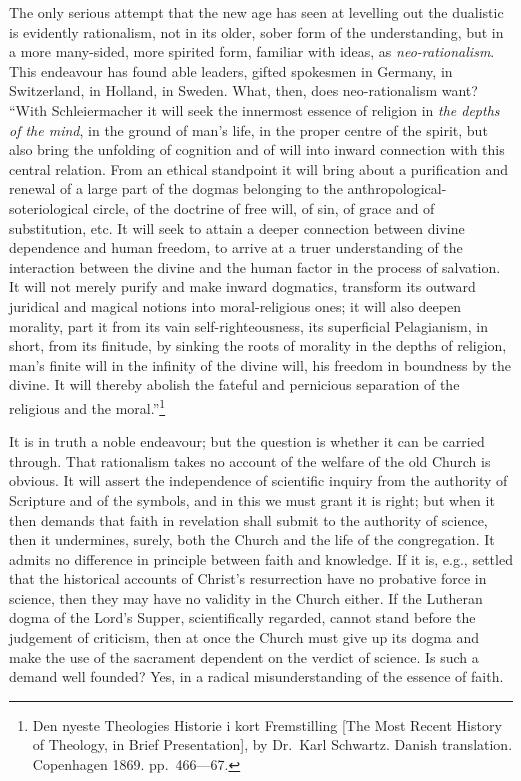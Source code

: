 \documentclass[12pt,a4paper,openany]{book}
\newcommand{\opage}[1]{\marginnote{\footnotesize\textit{[#1]}}}
\begin{document}
The only serious attempt that the new age has seen
at levelling out the dualistic is evidently rationalism,
not in its older, sober form of the understanding, but
in a more many-sided, more spirited form, familiar with ideas,
as \emph{neo-rationalism}. This endeavour has found
able leaders, gifted spokesmen in Germany, in
Switzerland, in Holland, in Sweden. What, then, does neo-rationalism want?
``With Schleiermacher it will seek the innermost essence
of religion in \emph{the depths of the mind}, in the ground of man's life,
in the proper centre of the spirit, but also bring
the unfolding of cognition and of will into inward connection
with this central relation. From an ethical
standpoint it will bring about a purification and renewal of
a large part of the dogmas belonging to the anthropological-soteriological
circle, of the doctrine of free will, of
sin, of grace and of substitution, etc. It
will seek to attain a deeper connection between divine
dependence and human freedom, to
arrive at a truer understanding of the interaction
between the divine and the human factor in
the process of salvation. It will not merely purify and make inward
dogmatics, transform its outward juridical and
magical notions into moral-religious ones; it will
also deepen morality, part it from its vain
self-righteousness, its superficial Pelagianism, in
short, from its finitude, by sinking the roots of morality
in the depths of religion, man's finite
will in the infinity of the divine will, his
freedom in boundness by the divine. It will
\setcounter{footnote}{0}%
\opage{105}thereby abolish the fateful and pernicious
separation of the religious and the moral.''\footnote{Den nyeste Theologies Historie i kort Fremstilling [The Most Recent History of Theology, in Brief Presentation], by Dr.\ Karl Schwartz. Danish translation. Copenhagen 1869. pp.\ 466---67.}

It is in truth a noble endeavour; but the question
is whether it can be carried through. That rationalism
takes no account of the welfare of the old Church is obvious.
It will assert the independence of scientific inquiry
from the authority of Scripture and of the symbols,
and in this we must grant it is right; but when it then
demands that faith in revelation shall submit to
the authority of science, then it undermines, surely, both
the Church and the life of the congregation. It admits no
difference in principle between faith and knowledge. If it is, e.g.,
settled that the historical accounts of Christ's resurrection
have no probative force in science, then
they may have no validity in the Church either. If the
Lutheran dogma of the Lord's Supper, scientifically regarded, cannot stand
before the judgement of criticism, then at once the Church must give up its dogma
and make the use of the sacrament dependent on the verdict
of science. Is such a demand well founded?
Yes, in a radical misunderstanding of the essence of faith.
\end{document}
